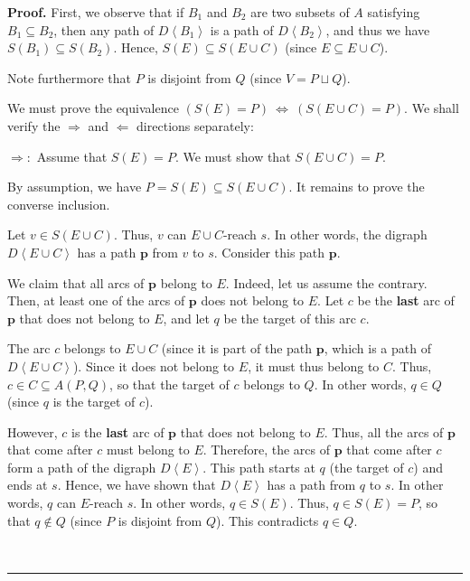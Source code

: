 \documentclass[numbers=enddot,12pt,final,onecolumn,notitlepage]{scrartcl}%
\theoremstyle{definition}
\newenvironment{proof}[1][Proof]{\noindent\textbf{#1.} }{\ \rule{0.5em}{0.5em}}
\theoremstyle{plainsl}
\begin{document}
\begin{proof}
First, we observe that if $B_{1}$ and $B_{2}$ are two subsets of $A$
satisfying $B_{1}\subseteq B_{2}$, then any path of $D\left\langle
B_{1}\right\rangle $ is a path of $D\left\langle B_{2}\right\rangle $, and
thus we have $S\left(  B_{1}\right)  \subseteq S\left(  B_{2}\right)  $.
Hence, $S\left(  E\right)  \subseteq S\left(  E\cup C\right)  $ (since
$E\subseteq E\cup C$).

Note furthermore that $P$ is disjoint from $Q$ (since $V=P\sqcup Q$).

We must prove the equivalence $\left(  S\left(  E\right)  =P\right)
\ \Longleftrightarrow\ \left(  S\left(  E\cup C\right)  =P\right)  $. We shall
verify the $\Longrightarrow$ and $\Longleftarrow$ directions separately: \medskip

$\Longrightarrow:$ Assume that $S\left(  E\right)  =P$. We must show that
$S\left(  E\cup C\right)  =P$.

By assumption, we have $P=S\left(  E\right)  \subseteq S\left(  E\cup
C\right)  $. It remains to prove the converse inclusion.

Let $v\in S\left(  E\cup C\right)  $. Thus, $v$ can $E\cup C$-reach $s$. In
other words, the digraph $D\left\langle E\cup C\right\rangle $ has a path
$\mathbf{p}$ from $v$ to $s$. Consider this path $\mathbf{p}$.

We claim that all arcs of $\mathbf{p}$ belong to $E$. Indeed, let us assume
the contrary. Then, at least one of the arcs of $\mathbf{p}$ does not belong
to $E$. Let $c$ be the \textbf{last} arc of $\mathbf{p}$ that does not belong
to $E$, and let $q$ be the target of this arc $c$.

The arc $c$ belongs to $E\cup C$ (since it is part of the path $\mathbf{p}$,
which is a path of $D\left\langle E\cup C\right\rangle $). Since it does not
belong to $E$, it must thus belong to $C$. Thus, $c\in C\subseteq A\left(
P,Q\right)  $, so that the target of $c$ belongs to $Q$. In other words, $q\in
Q$ (since $q$ is the target of $c$).

However, $c$ is the \textbf{last} arc of $\mathbf{p}$ that does not belong to
$E$. Thus, all the arcs of $\mathbf{p}$ that come after $c$ must belong to
$E$. Therefore, the arcs of $\mathbf{p}$ that come after $c$ form a path of
the digraph $D\left\langle E\right\rangle $. This path starts at $q$ (the
target of $c$) and ends at $s$. Hence, we have shown that $D\left\langle
E\right\rangle $ has a path from $q$ to $s$. In other words, $q$ can $E$-reach
$s$. In other words, $q\in S\left(  E\right)  $. Thus, $q\in S\left(
E\right)  =P$, so that $q\notin Q$ (since $P$ is disjoint from $Q$). This
contradicts $q\in Q$.


\end{proof}
\end{document}
